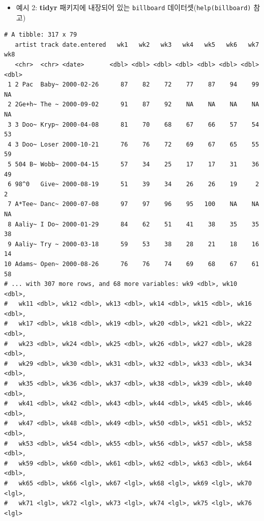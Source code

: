 \documentclass[
  11pt,
]{krantz}
\newenvironment{Shaded}{\begin{snugshade}}{\end{snugshade}}
\newcommand{\NormalTok}[1]{#1}
\newcommand{\OperatorTok}[1]{\textcolor[rgb]{0.43,0.43,0.43}{\textbf{#1}}}
\newcommand{\StringTok}[1]{\textcolor[rgb]{0.5,0.5,0.5}{#1}}
\providecommand{\tightlist}{%
  \setlength{\itemsep}{0pt}\setlength{\parskip}{0pt}}
\begin{document}
\normalsize

\begin{itemize}
\tightlist
\item
  예시 2: \textbf{tidyr} 패키지에 내장되어 있는 \texttt{billboard} 데이터셋(\texttt{help(billboard)} 참고)
\end{itemize}

\footnotesize

\begin{Shaded}
\end{Shaded}

\begin{verbatim}
# A tibble: 317 x 79
   artist track date.entered   wk1   wk2   wk3   wk4   wk5   wk6   wk7   wk8
   <chr>  <chr> <date>       <dbl> <dbl> <dbl> <dbl> <dbl> <dbl> <dbl> <dbl>
 1 2 Pac  Baby~ 2000-02-26      87    82    72    77    87    94    99    NA
 2 2Ge+h~ The ~ 2000-09-02      91    87    92    NA    NA    NA    NA    NA
 3 3 Doo~ Kryp~ 2000-04-08      81    70    68    67    66    57    54    53
 4 3 Doo~ Loser 2000-10-21      76    76    72    69    67    65    55    59
 5 504 B~ Wobb~ 2000-04-15      57    34    25    17    17    31    36    49
 6 98^0   Give~ 2000-08-19      51    39    34    26    26    19     2     2
 7 A*Tee~ Danc~ 2000-07-08      97    97    96    95   100    NA    NA    NA
 8 Aaliy~ I Do~ 2000-01-29      84    62    51    41    38    35    35    38
 9 Aaliy~ Try ~ 2000-03-18      59    53    38    28    21    18    16    14
10 Adams~ Open~ 2000-08-26      76    76    74    69    68    67    61    58
# ... with 307 more rows, and 68 more variables: wk9 <dbl>, wk10 <dbl>,
#   wk11 <dbl>, wk12 <dbl>, wk13 <dbl>, wk14 <dbl>, wk15 <dbl>, wk16 <dbl>,
#   wk17 <dbl>, wk18 <dbl>, wk19 <dbl>, wk20 <dbl>, wk21 <dbl>, wk22 <dbl>,
#   wk23 <dbl>, wk24 <dbl>, wk25 <dbl>, wk26 <dbl>, wk27 <dbl>, wk28 <dbl>,
#   wk29 <dbl>, wk30 <dbl>, wk31 <dbl>, wk32 <dbl>, wk33 <dbl>, wk34 <dbl>,
#   wk35 <dbl>, wk36 <dbl>, wk37 <dbl>, wk38 <dbl>, wk39 <dbl>, wk40 <dbl>,
#   wk41 <dbl>, wk42 <dbl>, wk43 <dbl>, wk44 <dbl>, wk45 <dbl>, wk46 <dbl>,
#   wk47 <dbl>, wk48 <dbl>, wk49 <dbl>, wk50 <dbl>, wk51 <dbl>, wk52 <dbl>,
#   wk53 <dbl>, wk54 <dbl>, wk55 <dbl>, wk56 <dbl>, wk57 <dbl>, wk58 <dbl>,
#   wk59 <dbl>, wk60 <dbl>, wk61 <dbl>, wk62 <dbl>, wk63 <dbl>, wk64 <dbl>,
#   wk65 <dbl>, wk66 <lgl>, wk67 <lgl>, wk68 <lgl>, wk69 <lgl>, wk70 <lgl>,
#   wk71 <lgl>, wk72 <lgl>, wk73 <lgl>, wk74 <lgl>, wk75 <lgl>, wk76 <lgl>
\end{verbatim}
\end{document}

